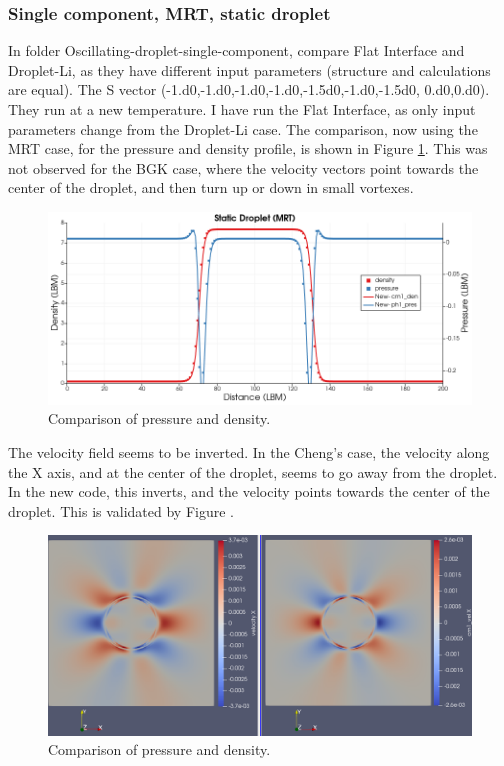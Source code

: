 \documentclass{article}
\begin{document}
	\subsubsection{Single component, MRT, static droplet}
	In folder Oscillating-droplet-single-component, compare Flat Interface and Droplet-Li, as they have different input parameters (structure and calculations are equal). The S vector (-1.d0,-1.d0,-1.d0,-1.d0,-1.5d0,-1.d0,-1.5d0,
	0.d0,0.d0). They run at a new temperature. I have run the Flat Interface, as only input parameters change from the Droplet-Li case. The comparison, now using the MRT case, for the pressure and density profile, is shown in Figure \ref{fig:val1CMRT}. This was not observed for the BGK case, where the velocity vectors point towards the center of the droplet, and then turn up or down in small vortexes.
	\begin{figure}[h]
		\centering
		\includegraphics[scale=0.4]{pics/MRT_StaticDroplet_PRho.png}
		\caption{Comparison of pressure and density.}
		\label{fig:val1CMRT}
	\end{figure}
	The velocity field seems to be inverted. In the Cheng's case, the velocity along the X axis, and at the center of the droplet, seems to go away from the droplet. In the new code, this inverts, and the velocity points towards the center of the droplet. This is validated by Figure .
	\begin{figure}[h]
		\centering
		\includegraphics[scale=0.3]{pics/MRT_StaticDroplet_VelField.png}
		\caption{Comparison of pressure and density.}
		\label{fig:MRT_StaticVelField}
	\end{figure}
\end{document}
